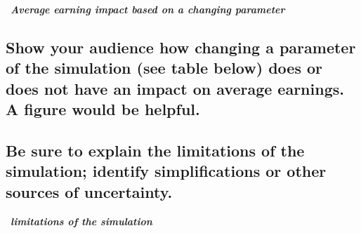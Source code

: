 \documentclass[
]{article}
\begin{document}
 \textbf{\emph{Average earning impact based on a changing parameter}}

\hypertarget{show-your-audience-how-changing-a-parameter-of-the-simulation-see-table-below-does-or-does-not-have-an-impact-on-average-earnings.-a-figure-would-be-helpful.}{%
\subsection{Show your audience how changing a parameter of the
simulation (see table below) does or does not have an impact on average
earnings. A figure would be
helpful.}\label{show-your-audience-how-changing-a-parameter-of-the-simulation-see-table-below-does-or-does-not-have-an-impact-on-average-earnings.-a-figure-would-be-helpful.}}

\hypertarget{be-sure-to-explain-the-limitations-of-the-simulation-identify-simplifications-or-other-sources-of-uncertainty.}{%
\subsection{Be sure to explain the limitations of the simulation;
identify simplifications or other sources of
uncertainty.}\label{be-sure-to-explain-the-limitations-of-the-simulation-identify-simplifications-or-other-sources-of-uncertainty.}}

 \textbf{\emph{limitations of the simulation}}
\end{document}
